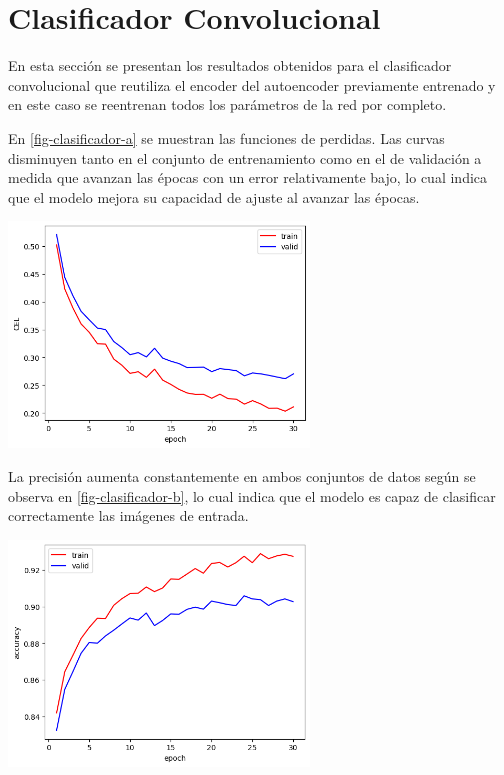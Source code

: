 \documentclass[aps,prl,reprint,groupedaddress]{revtex4-2}
\newenvironment{Figura}
  {\par\medskip\noindent\minipage{\linewidth}}
  {\endminipage\par\medskip}
\begin{document}
\section{Clasificador Convolucional}

En esta sección se presentan los resultados obtenidos para el clasificador
convolucional que reutiliza el encoder del autoencoder previamente entrenado y 
en este caso se reentrenan todos los parámetros de la red por completo.

En \ref{fig-clasificador-a} se muestran las funciones de perdidas. Las curvas 
disminuyen tanto en el conjunto de entrenamiento como en el de validación a 
medida que avanzan las épocas con un error relativamente bajo, lo cual indica 
que el modelo mejora su capacidad de ajuste al avanzar las épocas.
\begin{Figura}
  \centering
  \includegraphics[width=0.60\textwidth]{figs1/modelo_con_clasificador_a.png}
  \label{fig-clasificador-a}
\end{Figura}

La precisión aumenta constantemente en ambos conjuntos de datos según se observa 
en \ref{fig-clasificador-b}, lo cual indica que el modelo es capaz de clasificar 
correctamente las imágenes de entrada.
\begin{Figura}
  \centering
  \includegraphics[width=0.60\textwidth]{figs1/modelo_con_clasificador_b.png}
  \label{fig-clasificador-b}
\end{Figura}
\end{document}
